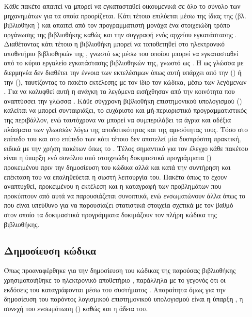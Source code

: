 \subsubsection{}
Κάθε πακέτο  απαιτεί να μπορεί να εγκατασταθεί οικουμενικά σε όλο το σύνολο των μηχανημάτων για τα οποία προορίζεται.
Κάτι τέτοιο επιλύεται μέσω της ίδιας της  (βλ. βιβλιοθήκη \href{https://pypi.org/project/setuptools/}{}) και απαιτεί από τον προγραμματιστή μονάχα ένα στοιχειώδη τρόπο οργάνωσης της βιβλιοθήκης καθώς και την συγγραφή ενός αρχείου εγκατάστασης .
Διαθέτοντας κάτι τέτοιο η βιβλιοθήκη μπορεί να τοποθετηθεί στο ηλεκτρονικό αποθετήριο βιβλιοθηκών της , γνωστό ως  μέσω του οποίου μπορεί να εγκατασταθεί από το κύριο εργαλείο εγκατάστασης βιβλιοθηκών της, γνωστό ως \href{https://pypi.org/project/pip/}{}.
Η  ως γλώσσα με διερμηνέα δεν διαθέτει την έννοια των εκτελέσιμων όπως αυτή υπάρχει από την  () ή την  (), ταυτίζοντας το πακέτο εκτέλεσης με τον ίδιο τον κώδικα, μέσω των λεγόμενων .
Για να καλυφθεί αυτή η ανάγκη τα λεγόμενα  εισήχθησαν από την κοινότητα που αναπτύσσει την γλώσσα .
Κάθε σύγχρονη βιβλιοθήκη επιστημονικού υπολογισμού () καλείται να μπορεί συνταιριάξει, το ευχάριστο και μή-περιοριστικό προγραμματιστικός της περιβάλλον, ενώ ταυτόχρονα να μπορεί να συμπεριλάβει τα άγρια και αδέξια πλάσματα των γλωσσών  λόγω της αποδοτικότητας και της αμεσότητας τους.
Τόσο στο επίπεδο του  και στο επίπεδο των  κάτι τέτοιο δεν αποτελεί μία δυσπρόσιτη πρακτική, ειδικά με την χρήση πακέτων όπως το \href{https://pypi.org/project/Cython/}{}.
Τέλος σημαντικό για τον έλεγχο κάθε πακέτου είναι η ύπαρξη ενό συνόλου από στοιχειώδη δοκιμαστικά προγράμματα () προκειμένου πριν την δημοσίευση του κώδικα αλλά και κατά την συντήρηση και επέκταση του να επαληθεύεται η σωστή λειτουργία του.
Πακέτα όπως το \href{https://pypi.org/project/nose/}{} έχουν αναπτυχθεί, προκειμένου η εκτέλεση και η καταγραφή των προβλημάτων που προκύπτουν από αυτά να παρουσιάζεται συνοπτικά, ενώ ενσωματώνουν άλλα όπως το \href{https://pypi.org/project/coverage/}{} που είναι υπεύθυνο για να παρουσίαζει στατιστικά στοιχεία σχετικά με τον βαθμό στον οποίο τα δοκιμαστικά προγράμματα δοκιμάζουν τον πλήρη κώδικα της βιβλιοθήκης.

\subsection{Δημοσίευση κώδικα}
Όπως προαναφέρθηκε για την δημοσίευση του κώδικας της παρούσας βιβλιοθήκης χρησιμοποιήθηκε το ηλεκτρονικό αποθετήριο \href{https://github.com/ysig/GraKeL}{}, παράλληλα με το γεγονός ότι οι εκδόσεις του καταγράφονται μέσω του συστήματος .
Απαραίτητα όμως για την δημοσίευση του παρόντος λογισμικού επιστημονικού υπολογισμού  είναι η ύπαρξη , η συνεχή του ενσωμάτωση () καθώς και η άδεια του.

